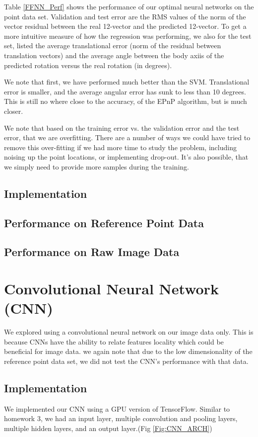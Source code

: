 \documentclass[journal]{IEEEtran}
\begin{document}
Table \ref{FFNN_Perf} shows the performance of our optimal neural networks on the point data set. Validation and test error are the RMS values of the norm of the vector residual between the real 12-vector and the predicted 12-vector. To get a more intuitive measure of how the regression was performing, we also for the test set, listed the average translational error (norm of the residual between translation vectors) and the average angle between the body axiis of the predicted rotation versus the real rotation (in degrees).

We note that first, we have performed much better than the SVM. Translational error is smaller, and the average angular error has sunk to less than 10 degrees. This is still no where close to the accuracy, of the EPnP algorithm, but is much closer.

We note that based on the training error vs. the validation error and the test error, that we are overfitting. There are a number of ways we could have tried to remove this over-fitting if we had more time to study the problem, including noising up the point locations, or implementing drop-out. It's also possible, that we simply need to provide more samples during the training.

\subsection{Implementation}

\subsection{Performance on Reference Point Data}

\subsection{Performance on Raw Image Data}

\section{Convolutional Neural Network (CNN)}
We explored using a convolutional neural network on our image data only. This is because CNNs have the ability to relate features locality which could be beneficial for image data. we again note that due to the low dimensionality of the reference point data set, we did not test the CNN's performance with that data. 
\subsection{Implementation}
We implemented our CNN using a GPU version of TensorFlow. Similar to homework 3, we had an input layer, multiple convolution and pooling layers, multiple hidden layers, and an output layer.(Fig \ref{Fig:CNN_ARCH})
\end{document}
